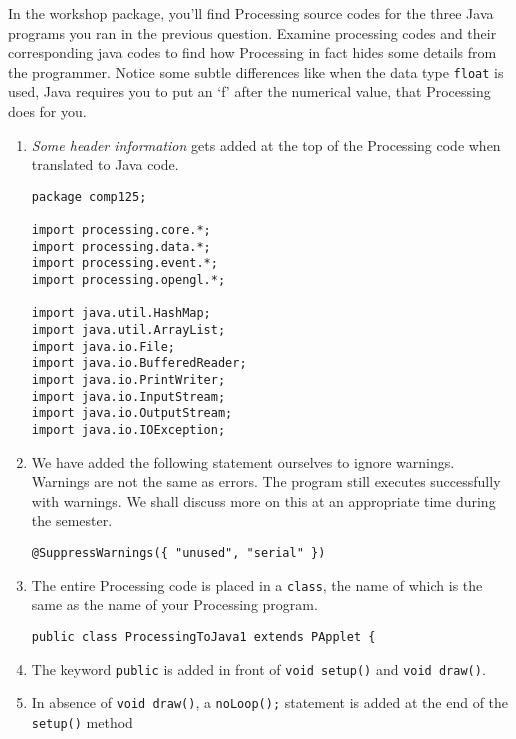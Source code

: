 \begin{questions}
In the workshop package, you'll find Processing source codes for the three Java programs you ran in the previous question. Examine processing codes and their corresponding java codes to find how Processing in fact hides some details from the programmer. Notice some subtle differences like when the data type \texttt{float} is used, Java requires you to put an `f' after the numerical value, that Processing does for you.

\begin{solution}

\begin{enumerate}

\item \emph{Some header information} gets added at the top of the Processing code when translated to Java code.

\begin{lstlisting}
package comp125;

import processing.core.*; 
import processing.data.*; 
import processing.event.*; 
import processing.opengl.*; 

import java.util.HashMap; 
import java.util.ArrayList; 
import java.io.File; 
import java.io.BufferedReader; 
import java.io.PrintWriter; 
import java.io.InputStream; 
import java.io.OutputStream; 
import java.io.IOException; 
\end{lstlisting}

\item We have added the following statement ourselves to ignore warnings. Warnings are not the same as errors. The program still executes successfully with warnings. We shall discuss more on this at an appropriate time during the semester.

\begin{lstlisting}
@SuppressWarnings({ "unused", "serial" }) 
\end{lstlisting}

\item The entire Processing code is placed in a \texttt{class}, the name of which is the same as the name of your Processing  program.

\begin{lstlisting}
public class ProcessingToJava1 extends PApplet {
\end{lstlisting}

\item The keyword \texttt{public} is added in front of \texttt{void setup()} and \texttt{void draw()}.

\item In absence of \texttt{void draw()}, a \texttt{noLoop();} statement is added at the end of the \texttt{setup()} method


\end{enumerate}
\end{solution}
\end{questions}
